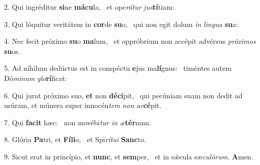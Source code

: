 2. Qui ingréditur \textbf{si}ne \textbf{má}\textbf{cu}la, \ast\  et ope\textit{rá}\textit{tur} \textit{jus}\textbf{tí}tiam:\

3. Qui lóquitur veritátem in \textbf{cor}de \textbf{su}o, \ast\  qui non egit dolum \textit{in} \textit{lin}\textit{gua} \textbf{su}a:\

4. Nec fecit próximo \textbf{su}o \textbf{ma}lum, \ast\  et oppróbrium non accépit advérsus \textit{pró}\textit{xi}\textit{mos} \textbf{su}os.\

5. Ad níhilum dedúctus est in conspéctu \textbf{e}jus ma\textbf{lí}gnus: \ast\  timéntes autem Dó\textit{mi}\textit{num} \textit{glo}\textbf{rí}ficat:\

6. Qui jurat próximo suo, \textbf{et} non \textbf{dé}\textbf{ci}pit, \ast\  qui pecúniam suam non dedit ad usúram, et múnera super innocén\textit{tem} \textit{non} \textit{ac}\textbf{cé}pit.\

7. Qui \textbf{fa}\textbf{cit} hæc: \ast\  non movébi\textit{tur} \textit{in} \textit{æ}\textbf{tér}num.\

8. Glória \textbf{Pa}tri, et \textbf{Fí}\textbf{li}o, \ast\  et Spi\textit{rí}\textit{tu}\textit{i} \textbf{Sanc}to.\

9. Sicut erat in princípio, et \textbf{nunc}, et \textbf{sem}per, \ast\  et in sǽcula sæ\textit{cu}\textit{ló}\textit{rum}. \textbf{A}men.\

